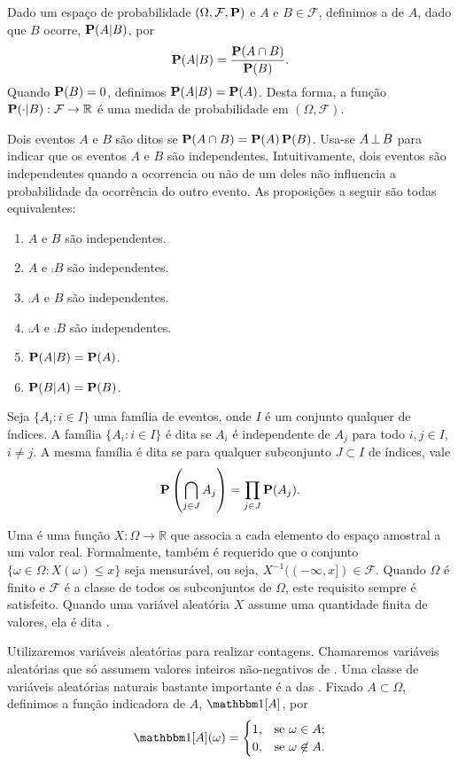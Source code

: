 Dado um espaço de probabilidade $(\Omega, \mathcal{F}, \operatorname{\mathbf{P}})$ e $A$ e $B \in \mathcal{F}$, definimos a  de $A$, dado que $B$ ocorre, $\operatorname{\mathbf{P}}(A | B)$, por
\[ \operatorname{\mathbf{P}}(A|B) = \frac{\operatorname{\mathbf{P}}(A \cap B)}{\operatorname{\mathbf{P}}(B)}. \]
Quando $\operatorname{\mathbf{P}}(B) = 0$, definimos $\operatorname{\mathbf{P}}(A|B) = \operatorname{\mathbf{P}}(A)$. Desta forma, a função $\operatorname{\mathbf{P}}(\cdot | B) : \mathcal{F} \to \mathbb{R}$ é uma medida de probabilidade em $(\Omega, \mathcal{F})$.

Dois eventos $A$ e $B$ são ditos  se $\operatorname{\mathbf{P}}(A \cap B) = \operatorname{\mathbf{P}}(A) \operatorname{\mathbf{P}}(B)$. Usa-se $A \operatorname{\perp} B$ para indicar que os eventos $A$ e $B$ são independentes. Intuitivamente, dois eventos são independentes quando a ocorrencia ou não de um deles não influencia a probabilidade da ocorrência do outro evento. As proposições a seguir são todas equivalentes:

\begin{enumerate}[label=\arabic*.,itemindent=*]
  \item $A$ e $B$ são independentes.
  \item $A$ e $\comp{B}$ são independentes.
  \item $\comp{A}$ e $B$ são independentes.
  \item $\comp{A}$ e $\comp{B}$ são independentes.
  \item $\operatorname{\mathbf{P}}(A|B) = \operatorname{\mathbf{P}}(A)$.
  \item $\operatorname{\mathbf{P}}(B|A) = \operatorname{\mathbf{P}}(B)$.
\end{enumerate}

Seja $\{ A_i : i \in I\}$ uma família de eventos, onde $I$ é um conjunto qualquer de índices. A família $\{ A_i : i \in I\}$ é dita  se $A_i$ é independente de $A_j$ para todo $i,j \in I$, $i \neq j$. A mesma família é dita  se para qualquer subconjunto $J \subset I$ de índices, vale
\[ \operatorname{\mathbf{P}}\left(\bigcap_{j \in J} A_j \right) = \prod_{j \in J}\operatorname{\mathbf{P}}(A_j).\]

Uma  é uma função $X: \Omega \to \mathbb{R}$ que associa a cada elemento do espaço amostral a um valor real. Formalmente, também é requerido que o conjunto $\{ \omega \in \Omega : X(\omega) \leq x \}$ seja mensurável, ou seja, $X^{-1}( (-\infty,x]) \in \mathcal{F}$. Quando $\Omega$ é finito e $\mathcal{F}$ é a classe de todos os subconjuntos de $\Omega$, este requisito sempre é satisfeito. Quando uma variável aleatória $X$ assume uma quantidade finita de valores, ela é dita .

Utilizaremos variáveis aleatórias para realizar contagens. Chamaremos  variáveis aleatórias que só assumem valores inteiros não-negativos de . Uma classe de variáveis aleatórias naturais bastante importante é a das . Fixado $A \subset \Omega$, definimos a função indicadora de $A$, $\ind{A}$, por
\[ \ind{A}(\omega) = \begin{cases}
  1, & \text{se } \omega \in A; \\
  0, & \text{se } \omega \not\in A.
\end{cases}\]

